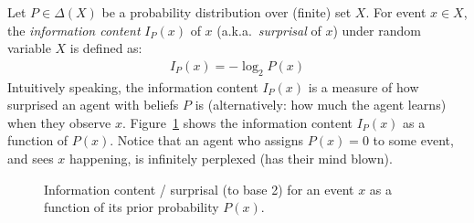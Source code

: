 \documentclass[nobib,nofonts]{tufte-handout}
\begin{document}
Let $P\in \Delta(X)$ be a probability distribution over (finite) set $X$.
For event $x \in X$, the \emph{information content} $I_{P}(x)$ of $x$ (a.k.a.~\emph{surprisal} of $x$) under random variable $X$ is defined as:
\begin{align*}
  I_{P}(x) = - \log_{2} P(x)
\end{align*}
Intuitively speaking, the information content $I_{P}(x)$ is a measure of how surprised an agent with beliefs $P$ is (alternatively: how much the agent learns) when they observe $x$.
Figure~\ref{fig:log-surprisal} shows the information content $I_{P}(x)$ as a function of $P(x)$.
Notice that an agent who assigns $P(x) = 0$ to some event, and sees $x$ happening, is infinitely perplexed (has their mind blown).

\begin{figure}
  \centering


{}

\caption{Information content / surprisal (to base 2) for an event $x$ as a function of its prior probability $P(x)$.}
\label{fig:log-surprisal}
\end{figure}
\end{document}
